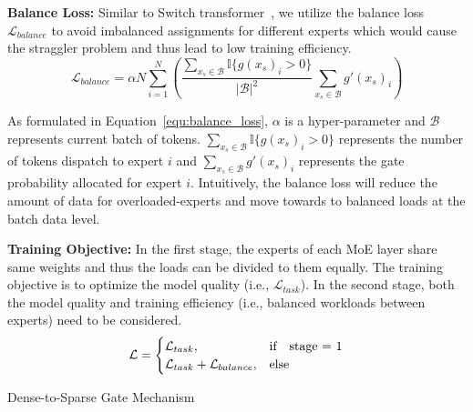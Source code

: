\textbf{Balance Loss:} Similar to Switch transformer~\cite{DBLP:switch}, we utilize the balance loss $\mathcal{L}_{balance}$ to avoid imbalanced assignments for different experts which would cause the straggler problem and thus lead to low training efficiency.
\begin{equation}
\mathcal{L}_{balance} = \alpha N \sum_{i=1}^N(\frac{\sum_{x_s \in \mathcal{B}}{\mathbb{I}\{g(x_s)_i} > 0\}}{|\mathcal{B}|^2} \sum_{x_s \in \mathcal{B}}{g'(x_s)_i})
\label{equ:balance_loss}
\end{equation}

\noindent As formulated in Equation~\ref{equ:balance_loss}, $\alpha$ is a hyper-parameter and $\mathcal{B}$ represents current batch of tokens. $\sum_{x_s \in \mathcal{B}}{\mathbb{I}\{g(x_s)_i} > 0\}$ represents the number of tokens dispatch to expert $i$ and $\sum_{x_s \in \mathcal{B}}{g'(x_s)_i}$ represents the gate probability allocated for expert $i$. Intuitively, the balance loss will reduce the amount of data for overloaded-experts and move towards to balanced loads  at the batch data level.

\textbf{Training Objective:}
In the first stage, the experts of each MoE layer share same weights and thus the loads can be divided to them equally. The training objective is to optimize the model quality (i.e., $\mathcal{L}_{task}$). In the second stage, both the model quality and training efficiency (i.e., balanced workloads between experts) need to be considered.
\begin{equation}
\mathcal{L} = \begin{cases}
  \mathcal{L}_{task}, &\text{if}\quad $stage = 1$ \\
  \mathcal{L}_{task} + \mathcal{L}_{balance}, &\text{else}
\end{cases}
\label{equ:train_obj}
\end{equation}

\setlength{\textfloatsep}{0.1cm}
\begin{algorithm}[t]
	\SetAlgoLined
	\SetInd{0.61em}{0.61em}
\caption{Dense-to-Sparse Gate Mechanism}
\label{alg:dts_algo}
\end{algorithm}

